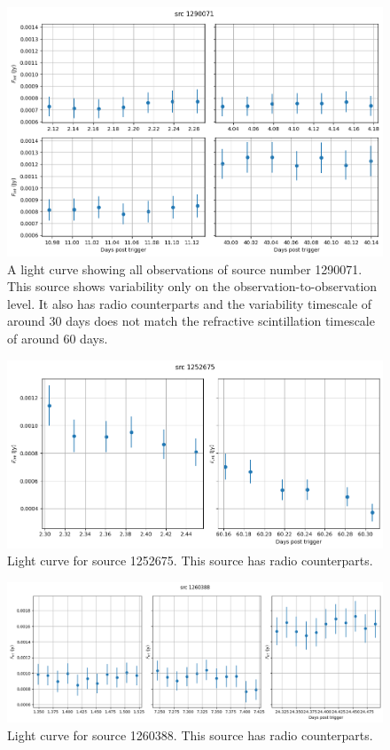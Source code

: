 \documentclass[12pt]{article}
\begin{document}
\begin{figure}
	\includegraphics[width=\textwidth]{src1290071multi.png}
	\caption{A light curve showing all observations of source number 1290071. This source shows variability only on the observation-to-observation level. It also has radio counterparts and the variability timescale of around 30 days does not match the refractive scintillation timescale of around 60 days.}
	\label{fig:src1290071multi}
\end{figure}
\begin{figure}
	\includegraphics[width=\textwidth]{src1252675multi.png}
	\caption{Light curve for source 1252675. This source has radio counterparts.}
	\label{fig:src1252675multi}
\end{figure}
\begin{figure}
	\includegraphics[width=\textwidth]{src1260388multi.png}
	\caption{Light curve for source 1260388. This source has radio counterparts.}
	\label{fig:src1260388multi}
\end{figure}
\end{document}
